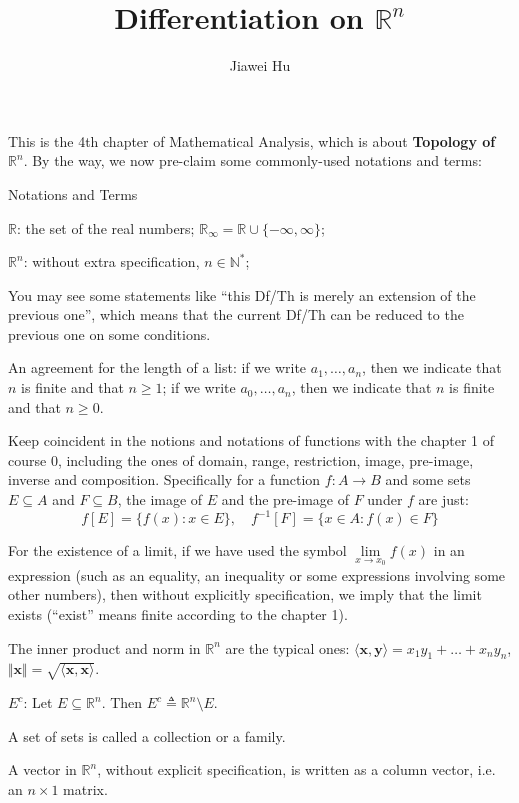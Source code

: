 \documentclass{article}
\title{\LARGE \textbf{Differentiation on $\mathbb{R}^n$}}
\author{\large Jiawei Hu}
\begin{document}
\maketitle

This is the 4th chapter of Mathematical Analysis, which is about \textbf{Topology of $\mathbb{R}^n$}. By the way, we now pre-claim some commonly-used notations and terms:
\begin{Df}{Notations and Terms}
    \begin{compactenum}
        \item $\mathbb{R}$: the set of the real numbers; $\mathbb{R}_\infty = \mathbb{R}\cup\{-\infty, \infty\}$;
        \item $\mathbb{R}^n$: without extra specification, $n\in\mathbb{N}^\ast$; 
        \item You may see some statements like ``this Df/Th is merely an extension of the previous one'', which means that the current Df/Th can be reduced to the previous one on some conditions.
        \item An agreement for the length of a list: if we write $a_1, \dots, a_n$, then we indicate that $n$ is finite and that $n\geq 1$; if we write $a_0, \dots, a_n$, then we indicate that $n$ is finite and that $n\geq 0$.
        \item Keep coincident in the notions and notations of functions with the chapter 1 of course 0, including the ones of domain, range, restriction, image, pre-image, inverse and composition. Specifically for a function $f: A\rightarrow B$ and some sets $E\subseteq A$ and $F\subseteq B$, the image of $E$ and the pre-image of $F$ under $f$ are just:
        $$f[E] = \{f(x): x\in E\},\quad f^{-1}[F] = \{x\in A: f(x)\in F\}$$
        \item For the existence of a limit, if we have used the symbol $\lim\limits_{x\to x_0} f(x)$ in an expression (such as an equality, an inequality or some expressions involving some other numbers), then without explicitly specification, we imply that the limit exists (``exist'' means finite according to the chapter 1).
        \item The inner product and norm in $\mathbb{R}^n$ are the typical ones: $\langle \pmb{x}, \pmb{y}\rangle = x_1y_1 + \dots + x_ny_n$, $\Vert \pmb{x}\Vert = \sqrt{\langle \pmb{x}, \pmb{x}\rangle}$.
        \item $E^c$: Let $E\subseteq\mathbb{R}^n$. Then $E^c\triangleq \mathbb{R}^n\setminus E$.
        \item A set of sets is called a collection or a family.
        \item A vector in $\mathbb{R}^n$, without explicit specification, is written as a column vector, i.e. an $n\times 1$ matrix.
    \end{compactenum}
\end{Df}
\end{document}
